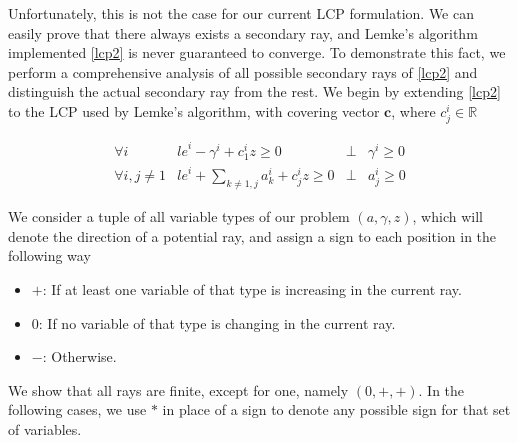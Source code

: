 \documentclass[a4paper,11pt]{article}
\begin{document}
\par Unfortunately, this is not the case for our current LCP formulation. We can easily prove that there always
exists a secondary ray, and Lemke's algorithm implemented \eqref{lcp2} is never guaranteed to converge. To
demonstrate this fact, we perform a comprehensive analysis of all possible secondary rays of \eqref{lcp2}
and distinguish the actual secondary ray from the rest. We begin by extending \eqref{lcp2} to the LCP used by
Lemke's algorithm, with covering vector $\bm{c}$, where $c^i_j \in \mathbb{R}$

\begin{equation}\label{lcp3}
\begin{array}{lccl}
\forall i & {le}^i - \gamma^i + c^i_1 z \geq 0 & \bot & \gamma^i \geq 0 \\
\forall i, j \neq 1 & {le}^i + \sum_{k \neq 1, j} {a^i_k} + c^i_j z \geq 0 & \bot & a^i_j \geq 0
\end{array}
\end{equation}

\par We consider a tuple of all variable types of our problem $(a, \gamma, z)$, which will denote the direction of
a potential ray, and assign a sign to each position in the following way

\begin{itemize}
\item $+$: If at least one variable of that type is increasing in the current ray.
\item $0$: If no variable of that type is changing in the current ray.
\item $-$: Otherwise.
\end{itemize}

\par We show that all rays are finite, except for one, namely $(0, +, +)$. In the following  cases, we use $*$ in
place of a sign to denote any possible sign for that set of variables.
\end{document}
